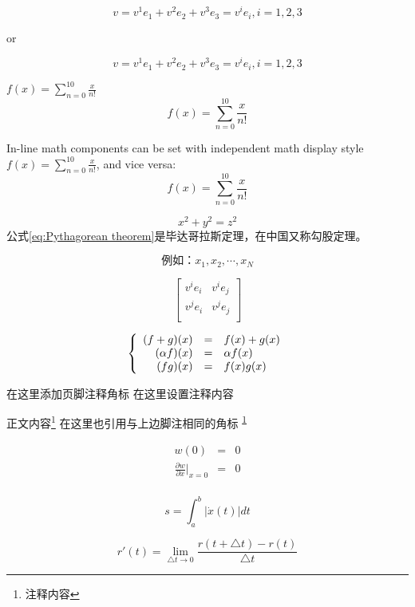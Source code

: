 \documentclass[12pt, letterpaper]{book}
\begin{document}
\newpage
$$
v = v^{1}e_{1} + v^{2}e_{2} + v^{3}e_{3} = v^{i}e_{i}, i = 1,2,3
$$

or 

\begin{equation}
v = v^{1}e_{1} + v^{2}e_{2} + v^{3}e_{3} = v^{i}e_{i}, i = 1,2,3
\end{equation}

$f(x) = \sum_{n=0}^{10} \frac{x}{n!}$  \\

$$
f(x) = \sum_{n=0}^{10} \frac{x}{n!}
$$

In-line math components can be set with independent math display style 
$f(x) = \displaystyle \sum_{n=0}^{10} \frac{x}{n!}$, and vice versa:
$$
f(x) = \scriptstyle \sum_{n=0}^{10} \frac{x}{n!}
$$


\begin{equation}\label{eq:Pythagorean theorem}
x^{2}+y^{2}=z^{2}
\end{equation}
公式\ref{eq:Pythagorean theorem}是毕达哥拉斯定理，在中国又称勾股定理。

$$
\mbox{例如：} x_{1}, x_{2}, \cdots, x_{N} 
$$ 

$$
\left [
\begin{array}{cc}
v^{i} e_{i} & v^{i} e_{j}  \\
v^{j} e_{i} & v^{j} e_{j}  \\
\end{array}
\right ]
$$

$$
\left \{
\begin{array}{r c l}
(f + g)(x)    & = &  f(x) + g(x) \\
(\alpha f)(x) & = &  \alpha f(x) \\
(fg)(x)       & = &  f(x)g(x)    \\
\end{array}
\right .
$$

在这里添加页脚注释角标\footnotemark
在这里设置注释内容

正文内容\footnote{注释内容\label{fnote}}
在这里也引用与上边脚注相同的角标 \textsuperscript{\ref{fnote}}


\newpage
\begin{eqnarray} 
w(0) & = & 0 \\
\frac{\partial w}{\partial x}\Big |_{x=0} & = & 0  \\
\end{eqnarray}


$$ s = \int_{a}^{b} |\dot{x}(t)| dt  $$

$$ r'(t) = \lim \limits_{\triangle t \rightarrow 0} \frac{ r(t + \triangle t) - r(t)}{ \triangle t }$$
\end{document}

